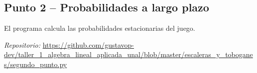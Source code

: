 \subsection{Punto 2 – Probabilidades a largo plazo}
El programa calcula las probabilidades estacionarias del juego.

\vspace{0.3em}
\noindent\emph{Repositorio:} \url{https://github.com/gustavop-dev/taller_1_algebra_lineal_aplicada_unal/blob/master/escaleras_y_toboganes/segundo_punto.py}
